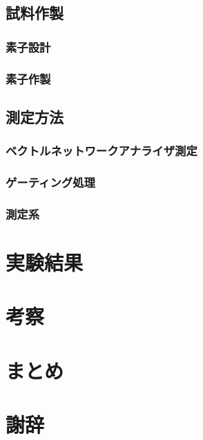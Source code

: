 \documentclass[dvipdfmx]{jsreport}
\numberwithin{equation}{chapter}
\numberwithin{table}{chapter}
\begin{document}
\subsection{}
\subsection{}
\subsection{}
\section{試料作製}
\subsection{素子設計}
\subsection{素子作製}
\section{測定方法}
\subsection{ベクトルネットワークアナライザ測定}
\subsection{ゲーティング処理}
\subsection{測定系}
\chapter{実験結果}
\chapter{考察}
\chapter{まとめ}
\chapter{謝辞}
\end{document}
